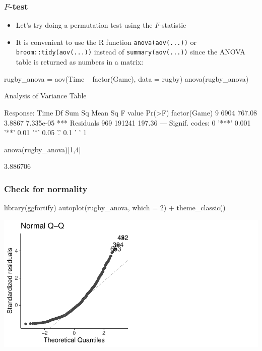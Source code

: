 \documentclass[a4paper]{article}
\begin{document}
\subsubsection{\( F \)-test}
\begin{itemize}
	\item Let's try doing a permutation test using the \( F \)-statistic
	\item It is convenient to use the R function \lstinline|anova(aov(...))| or \lstinline|broom::tidy(aov(...))| instead of \lstinline|summary(aov(...))| since the ANOVA table is returned as numbers in a matrix:
\end{itemize}
\begin{Schunk}
\begin{Sinput}
rugby_anova = aov(Time ~ factor(Game), data = rugby)
anova(rugby_anova)
\end{Sinput}
\begin{Soutput}
Analysis of Variance Table

Response: Time
              Df Sum Sq Mean Sq F value    Pr(>F)    
factor(Game)   9   6904  767.08  3.8867 7.335e-05 ***
Residuals    969 191241  197.36                      
---
Signif. codes:  0 '***' 0.001 '**' 0.01 '*' 0.05 '.' 0.1 ' ' 1
\end{Soutput}
\begin{Sinput}
anova(rugby_anova)[1,4]
\end{Sinput}
\begin{Soutput}
[1] 3.886706
\end{Soutput}
\end{Schunk}
\subsubsection{Check for normality}
\begin{Schunk}
\begin{Sinput}
library(ggfortify)
autoplot(rugby_anova, which = 2) +
theme_classic()
\end{Sinput}


{\centering \includegraphics[width=\maxwidth]{figure/listings-unnamed-chunk-270-1} 

}

\end{Schunk}
\end{document}
